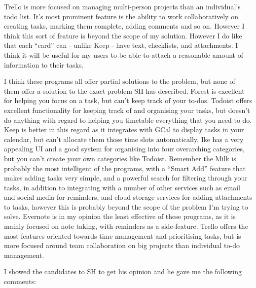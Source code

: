 \documentclass{article}
\begin{document}
Trello is more focused on managing multi-person projects than an individual's
todo list. It's most prominent feature is the ability to work collaboratively on
creating tasks, marking them complete, adding comments and so on. However I
think this sort of feature is beyond the scope of my solution. However I do like
that each ``card'' can - unlike Keep - have text, checklists, and attachments. I
think it will be useful for my users to be able to attach a reasonable amount of
information to their tasks.

I think these programs all offer partial solutions to the problem, but none of
them offer a solution to the exact problem SH has described. Forest is excellent
for helping you focus on a task, but can't keep track of your to-dos. Todoist
offers excellent functionality for keeping track of and organising your tasks,
but doesn't do anything with regard to helping you timetable everything that you
need to do. Keep is better in this regard as it integrates with GCal to display
tasks in your calendar, but can't allocate them those time slots automatically.
Ike has a very appealing UI and a good system for organising into four
overarching categories, but you can't create your own categories like Todoist.
Remember the Milk is probably the most intelligent of the programs, with a
``Smart Add'' feature that makes adding tasks very simple, and a powerful search
for filtering through your tasks, in addition to integrating with a number of
other services such as email and social media for reminders, and cloud storage
services for adding attachments to tasks, however this is probably beyond the
scope of the problem I'm trying to solve. Evernote is in my opinion the least
effective of these programs, as it is mainly focused on note taking, with
reminders as a side-feature. Trello offers the most features oriented towards
time management and prioritising tasks, but is more focused around team
collaboration on big projects than individual to-do management.

I showed the candidates to SH to get his opinion and he gave me the following
comments:
\end{document}
